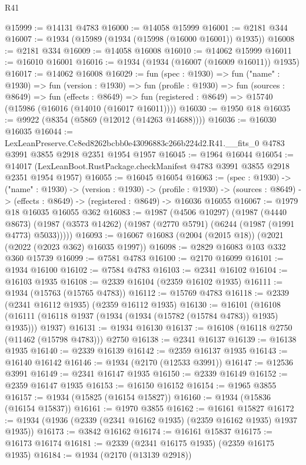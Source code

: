 \begin{lexlean}{R41}
\begin{coremodule}
@15999 := @14131 @4783
@16000 := @14058 @15999
@16001 := @2181 @344
@16007 := @1934 (@15989 (@1934 (@15998 (@16000 @16001)) @1935))
@16008 := @2181 @334
@16009 := @14058 @16008
@16010 := @14062 @15999
@16011 := @16010 @16001
@16016 := @1934 (@1934 (@16007 (@16009 @16011)) @1935)
@16017 := @14062 @16008
@16029 := fun (spec : @1930) =>
  fun ("name" : @1930) =>
  fun (version : @1930) =>
  fun (profile : @1930) =>
  fun (sources : @8649) =>
  fun (effects : @8649) =>
  fun (registered : @8649) => @15740 (@15986 (@16016 (@14010 (@16017 @16011))))
@16030 := @1950 @18
@16035 := @9922 (@8354 (@5869 (@12012 (@14263 @14688))))
@16036 := @16030 @16035
@16044 := LexLeanPreserve.Cc8ed8262bcbb0e43096883c266b224d2.R41.__fits_0
    @4783
    @3991
    @3855
    @2918
    @2351
    @1954
    @1957
@16045 := @1964 @16044
@16054 := @14017 (LexLeanBoot.RustPackage.checkManifest @4783 @3991 @3855 @2918 @2351 @1954 @1957)
@16055 := @16045 @16054
@16063 := (spec : @1930) ->
  ("name" : @1930) ->
  (version : @1930) ->
  (profile : @1930) ->
  (sources : @8649) -> (effects : @8649) -> (registered : @8649) -> @16036 @16055
@16067 := @1979 @18 @16035 @16055 @362
@16083 := @1987
    (@4506 @10297)
    (@1987
      (@4440 @8673)
      (@1987 (@3573 @14262) (@1987 (@2770 @5791) (@6244 (@1987 (@1991 @4773) @5033)))))
@16093 := @16067 @16083 (@2004 (@2015 @18)) (@2021 (@2022 (@2023 @362) @16035 @1997))
@16098 := @2829 @16083 @103 @332 @360 @15739
@16099 := @7581 @4783
@16100 := @2170 @16099
@16101 := @1934 @16100
@16102 := @7584 @4783
@16103 := @2341 @16102
@16104 := @16103 @1935
@16108 := @2339 @16104 (@2359 @16102 @1935)
@16111 := @1934 (@15763 (@15765 @4783))
@16112 := @15769 @4783
@16118 := @2339 (@2341 @16112 @1935) (@2359 @16112 @1935)
@16130 := @16101
    (@16108 (@16111 (@16118 @1937 (@1934 (@1934 (@15782 (@15784 @4783)) @1935) @1935))) @1937)
@16131 := @1934 @16130
@16137 := @16108 (@16118 @2750 (@11462 (@15798 @4783))) @2750
@16138 := @2341 @16137
@16139 := @16138 @1935
@16140 := @2339 @16139
@16142 := @2359 @16137 @1935
@16143 := @16140 @16142
@16146 := @1934 (@2170 (@12533 @3991))
@16147 := @12536 @3991
@16149 := @2341 @16147 @1935
@16150 := @2339 @16149
@16152 := @2359 @16147 @1935
@16153 := @16150 @16152
@16154 := @1965 @3855
@16157 := @1934 (@15825 (@16154 @15827))
@16160 := @1934 (@15836 (@16154 @15837))
@16161 := @1970 @3855
@16162 := @16161 @15827
@16172 := @1934 (@1936 (@2339 (@2341 @16162 @1935) (@2359 @16162 @1935) @1937 @1935))
@16173 := @3842 @16162
@16174 := @16161 @15837
@16175 := @16173 @16174
@16181 := @2339 (@2341 @16175 @1935) (@2359 @16175 @1935)
@16184 := @1934 (@2170 (@13139 @2918))

\end{coremodule}
\end{lexlean}
